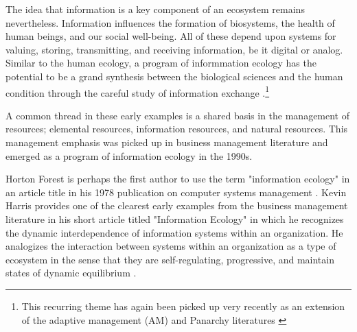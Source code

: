 The idea that information is a key component of an ecosystem remains nevertheless. Information influences the formation of biosystems, the health of human beings, and our social well-being. All of these depend upon systems for valuing, storing, transmitting, and receiving information, be it digital or analog. Similar to the human ecology, a program of informmation ecology has the potential to be a grand synthesis between the biological sciences and the human condition through the careful study of information exchange \citep{eryomin_information_1998}.\footnote{This recurring theme has again been picked up very recently as an extension of the adaptive management (AM) and Panarchy literatures \citep{eddy_information_2014}} 

A common thread in these early examples is a shared basis in the management of resources; elemental resources, information resources, and natural resources. This management emphasis was picked up in business management literature and emerged as a program of information ecology in the 1990s. 

Horton Forest is perhaps the first author to use the term "information ecology" in an article title in his 1978 publication on computer systems management \citep{forest_1978}. Kevin Harris provides one of the clearest early examples from the business management literature in his short article titled "Information Ecology" in which he recognizes the dynamic interdependence of information systems within an organization. He analogizes the interaction between systems within an organization as a type of ecosystem in the sense that they are self-regulating, progressive, and maintain states of dynamic equilibrium \citep{harris_information_1989}. 